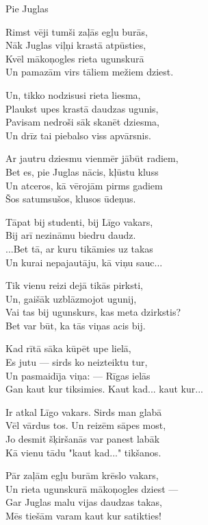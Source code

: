 \documentclass[14pt]{extarticle}
\begin{document}
{{\newpage

{\large \sc Pie Juglas}

Rimst vēji tumši zaļās egļu burās,\\
Nāk Juglas viļņi krastā atpūsties,\\
Kvēl mākoņogles rieta ugunskurā\\
Un pamazām virs tāliem mežiem dziest.

Un, tikko nodzisusi rieta liesma,\\
Plaukst upes krastā daudzas ugunis,\\
Pavisam nedroši sāk skanēt dziesma,\\
Un drīz tai piebalso viss apvārsnis.

Ar jautru dziesmu vienmēr jābūt radiem,\\
Bet es, pie Juglas nācis, kļūstu kluss\\
Un atceros, kā vērojām pirms gadiem\\
Šos satumsušos, klusos ūdeņus.

Tāpat bij studenti, bij Līgo vakars,\\
Bij arī nezināmu biedru daudz.\\
...Bet tā, ar kuru tikāmies uz takas\\
Un kurai nepajautāju, kā viņu sauc...

Tik vienu reizi dejā tikās pirksti,\\
Un, gaišāk uzblāzmojot ugunij,\\
Vai tas bij ugunskurs, kas meta dzirkstis?\\
Bet var būt, ka tās viņas acis bij.

Kad rītā sāka kūpēt upe lielā,\\
Es jutu --- sirds ko neizteiktu tur,\\
Un pasmaidīja viņa: --- Rīgas ielās\\
Gan kaut kur tiksimies. Kaut kad... kaut kur...

Ir atkal Līgo vakars. Sirds man glabā\\
Vēl vārdus tos. Un reizēm sāpes most,\\
Jo desmit šķiršanās var panest labāk\\
Kā vienu tādu "kaut kad..." tikšanos.

Pār zaļām egļu burām krēslo vakars,\\
Un rieta ugunskurā mākoņogles dziest ---\\
Gar Juglas malu vijas daudzas takas,\\
Mēs tiešām varam kaut kur satikties!


}}
\end{document}

